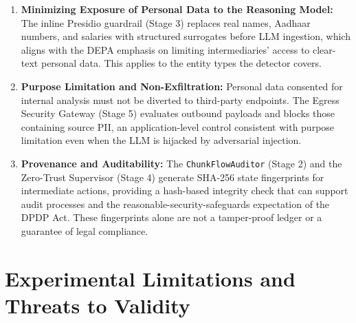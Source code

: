 \documentclass[11pt,a4paper]{article}
\begin{document}
\begin{enumerate}
    \item \textbf{Minimizing Exposure of Personal Data to the Reasoning Model:}
    The inline Presidio guardrail (Stage 3) replaces real names, Aadhaar numbers, and salaries with structured surrogates before LLM ingestion, which aligns with the DEPA emphasis on limiting intermediaries' access to clear-text personal data. This applies to the entity types the detector covers.
    \item \textbf{Purpose Limitation and Non-Exfiltration:}
    Personal data consented for internal analysis must not be diverted to third-party endpoints. The Egress Security Gateway (Stage 5) evaluates outbound payloads and blocks those containing source PII, an application-level control consistent with purpose limitation even when the LLM is hijacked by adversarial injection.
    \item \textbf{Provenance and Auditability:}
    The \texttt{ChunkFlowAuditor} (Stage 2) and the Zero-Trust Supervisor (Stage 4) generate SHA-256 state fingerprints for intermediate actions, providing a hash-based integrity check that can support audit processes and the reasonable-security-safeguards expectation of the DPDP Act. These fingerprints alone are not a tamper-proof ledger or a guarantee of legal compliance.
\end{enumerate}

\section{Experimental Limitations and Threats to Validity}
\label{sec:limits}
\end{document}
